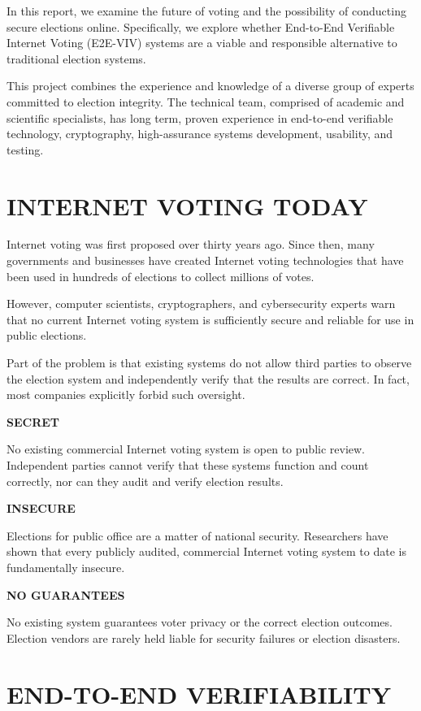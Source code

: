 In this report, we examine the future of voting and the possibility of
conducting secure elections online. Specifically, we explore whether
End-to-End Verifiable Internet Voting (E2E-VIV) systems are a viable
and responsible alternative to traditional election systems.

This project combines the experience and knowledge of a diverse group
of experts committed to election integrity. The technical team,
comprised of academic and scientific specialists, has long term,
proven experience in end-to-end verifiable technology, cryptography,
high-assurance systems development, usability, and testing.

\section*{INTERNET VOTING TODAY}

Internet voting was first proposed over thirty years ago. Since then,
many governments and businesses have created Internet voting
technologies that have been used in hundreds of elections to collect
millions of votes.

However, computer scientists, cryptographers, and cybersecurity
experts warn that no current Internet voting system is sufficiently
secure and reliable for use in public elections.

Part of the problem is that existing systems do not allow third
parties to observe the election system and independently verify that
the results are correct.  In fact, most companies explicitly forbid
such oversight.

\noindent \textbf{SECRET}

No existing commercial Internet voting system is open to public
review. Independent parties cannot verify that these systems function
and count correctly, nor can they audit and verify election results.

\textbf{INSECURE}

Elections for public office are a matter of national
security. Researchers have shown that every publicly audited,
commercial Internet voting system to date is fundamentally insecure.

\noindent \textbf{NO GUARANTEES}

No existing system guarantees voter privacy or the correct election
outcomes.  Election vendors are rarely held liable for security
failures or election disasters.

\newpage

\section*{END-TO-END VERIFIABILITY}

